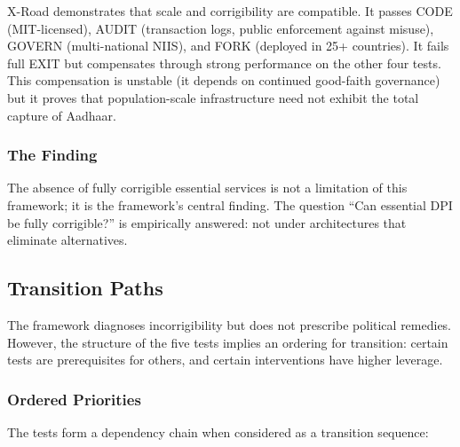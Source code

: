 X-Road demonstrates that scale and corrigibility are compatible. It passes CODE (MIT-licensed), AUDIT (transaction logs, public enforcement against misuse), GOVERN (multi-national NIIS), and FORK (deployed in 25+ countries). It fails full EXIT but compensates through strong performance on the other four tests. This compensation is unstable (it depends on continued good-faith governance) but it proves that population-scale infrastructure need not exhibit the total capture of Aadhaar.

\subsubsection{The Finding}

The absence of fully corrigible essential services is not a limitation of this framework; it is the framework's central finding. The question ``Can essential DPI be fully corrigible?'' is empirically answered: not under architectures that eliminate alternatives.

\subsection{Transition Paths}
\label{subsec:transition}

The framework diagnoses incorrigibility but does not prescribe political remedies. However, the structure of the five tests implies an ordering for transition: certain tests are prerequisites for others, and certain interventions have higher leverage.

\subsubsection{Ordered Priorities}

The tests form a dependency chain when considered as a transition sequence:

